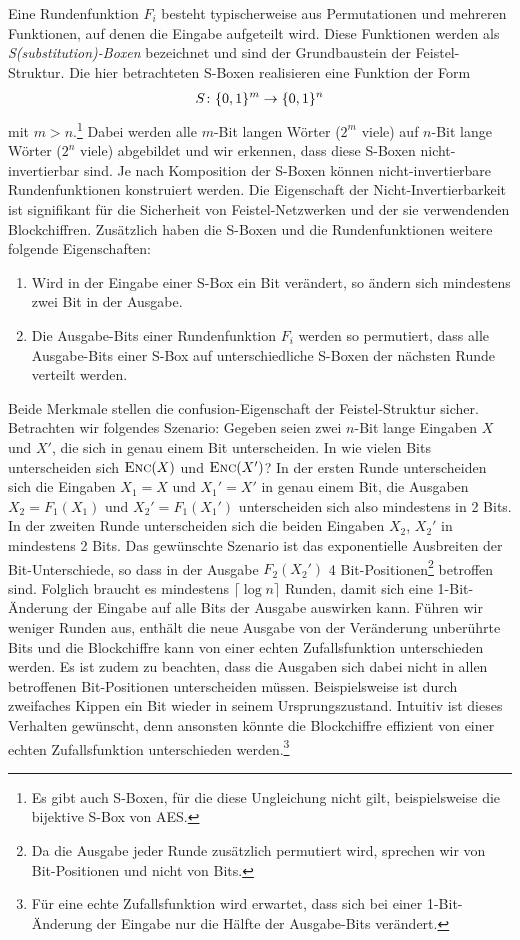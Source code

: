 Eine Rundenfunktion \(F_i\) besteht typischerweise aus Permutationen und mehreren Funktionen, auf denen die Eingabe aufgeteilt wird. Diese Funktionen werden als \textit{S(substitution)-Boxen} \indexSBOX bezeichnet und sind der Grundbaustein der Feistel-Struktur. Die hier betrachteten S-Boxen realisieren eine Funktion der Form
\begin{align*}
	S \colon \{0, 1\}^m \rightarrow \{0, 1\}^n
\end{align*}
mit \(m > n\).\footnote{Es gibt auch S-Boxen, für die diese Ungleichung nicht gilt, beispielsweise die bijektive S-Box von AES.} Dabei werden alle $m$-Bit langen Wörter (\(2^m\) viele) auf $n$-Bit lange Wörter (\(2^n\) viele) abgebildet und wir erkennen, dass diese S-Boxen nicht-invertierbar sind. Je nach Komposition der S-Boxen können nicht-invertierbare Rundenfunktionen konstruiert werden. Die Eigenschaft der Nicht-Invertierbarkeit ist signifikant für die Sicherheit von Feistel-Netzwerken und der sie verwendenden Blockchiffren. Zusätzlich haben die S-Boxen und die Rundenfunktionen weitere folgende Eigenschaften:
\begin{enumerate}
	\item Wird in der Eingabe einer S-Box ein Bit verändert, so ändern sich mindestens zwei Bit in der Ausgabe.
	\item Die Ausgabe-Bits einer Rundenfunktion $F_i$ werden so permutiert, dass alle Ausgabe-Bits einer S-Box auf unterschiedliche S-Boxen der nächsten Runde verteilt werden.
\end{enumerate}
Beide Merkmale stellen die confusion-Eigenschaft der Feistel-Struktur sicher. 
Betrachten wir folgendes Szenario: Gegeben seien zwei $n$-Bit lange Eingaben $X$ und $X'$, die sich in genau einem Bit unterscheiden. In wie vielen Bits unterscheiden sich $\textsc{Enc}(X)$ und $\textsc{Enc}(X')$? In der ersten Runde unterscheiden sich die Eingaben $X_1 = X$ und $X_1' = X'$ in genau einem Bit, die Ausgaben $X_2 = F_1(X_1)$ und $X_2' = F_1(X_1')$ unterscheiden sich also mindestens in 2 Bits. In der zweiten Runde unterscheiden sich die beiden Eingaben $X_2$, $X_2'$ in mindestens 2 Bits. Das gewünschte Szenario ist das exponentielle Ausbreiten der Bit-Unterschiede, so dass in der Ausgabe $F_2(X_2')$ 4 Bit-Positionen\footnote{Da die Ausgabe jeder Runde zusätzlich permutiert wird, sprechen wir von Bit-Positionen und nicht von Bits.} betroffen sind. Folglich braucht es mindestens $\lceil \log n \rceil$ Runden, damit sich eine 1-Bit-Änderung der Eingabe auf alle Bits der Ausgabe auswirken kann. Führen wir weniger Runden aus, enthält die neue Ausgabe von der Veränderung unberührte Bits und die Blockchiffre kann von einer echten Zufallsfunktion unterschieden werden. Es ist zudem zu beachten, dass die Ausgaben sich dabei nicht in allen betroffenen Bit-Positionen unterscheiden müssen. Beispielsweise ist durch zweifaches Kippen ein Bit wieder in seinem Ursprungszustand. Intuitiv ist dieses Verhalten gewünscht, denn ansonsten könnte die Blockchiffre effizient von einer echten Zufallsfunktion unterschieden werden.\footnote{Für eine echte Zufallsfunktion wird erwartet, dass sich bei einer 1-Bit-Änderung der Eingabe nur die Hälfte der Ausgabe-Bits verändert.}

